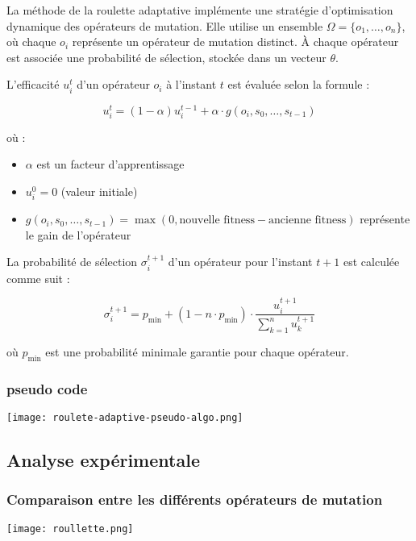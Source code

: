 \documentclass{article}
\begin{document}
La méthode de la roulette adaptative implémente une stratégie d'optimisation dynamique des opérateurs de mutation. Elle utilise un ensemble $\Omega = \{o_1, \ldots, o_n\}$, où chaque $o_i$ représente un opérateur de mutation distinct. À chaque opérateur est associée une probabilité de sélection, stockée dans un vecteur $\theta$.

L'efficacité $u^t_i$ d'un opérateur $o_i$ à l'instant $t$ est évaluée selon la formule :

\begin{equation}
    u^t_i = (1 - \alpha)u^{t-1}_i + \alpha \cdot g(o_i, s_0, \ldots, s_{t-1})
\end{equation}

où :
\begin{itemize}
    \item $\alpha$ est un facteur d'apprentissage
    \item $u^0_i = 0$ (valeur initiale)
    \item $g(o_i, s_0, \ldots, s_{t-1}) = \max(0, \text{nouvelle fitness} - \text{ancienne fitness})$ représente le gain de l'opérateur
\end{itemize}

La probabilité de sélection $\sigma^{t+1}_i$ d'un opérateur pour l'instant $t+1$ est calculée comme suit :

\begin{equation}
    \sigma^{t+1}_i = p_{\text{min}} + (1 - n \cdot p_{\text{min}}) \cdot \frac{u^{t+1}_i}{\sum_{k=1}^n u^{t+1}_k}
\end{equation}

où $p_{\text{min}}$ est une probabilité minimale garantie pour chaque opérateur.

\subsubsection{pseudo code}
\texttt{[image: roulete-adaptive-pseudo-algo.png]}

\subsection{Analyse expérimentale}

\subsubsection{Comparaison entre les différents opérateurs de mutation}
\texttt{[image: roullette.png]}
\end{document}
